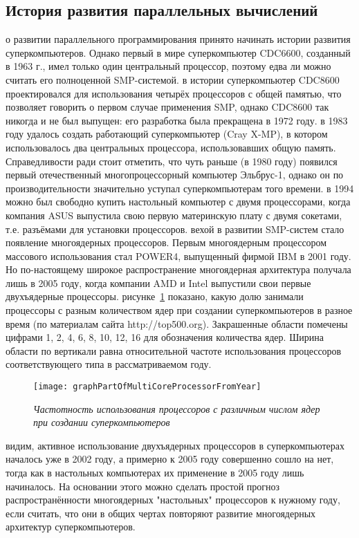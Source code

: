 { %
	\subsection{История развития параллельных вычислений}
	\Large{} о развитии параллельного программирования принято начинать истории развития суперкомпьютеров. Однако первый в мире суперкомпьютер CDC6600, созданный в 1963 г., имел только один центральный процессор, поэтому едва ли можно считать его полноценной SMP-системой. 
	 в истории суперкомпьютер CDC8600 проектировался для использования четырёх процессоров с общей памятью, что позволяет говорить о первом случае применения SMP, однако CDC8600 так никогда и не был выпущен: его разработка была прекращена в 1972 году. 
	 в 1983 году удалось создать работающий суперкомпьютер (Cray X-MP), в котором использовалось два центральных процессора, использовавших общую память. Справедливости ради стоит отметить, что чуть раньше (в 1980 году) появился первый отечественный многопроцессорный компьютер Эльбрус-1, однако он по производительности значительно уступал суперкомпьютерам того времени.
	 в 1994 можно был свободно купить настольный компьютер с двумя процессорами, когда компания ASUS выпустила свою первую материнскую плату с двумя сокетами, т.е. разъёмами для установки процессоров.
	 вехой в развитии SMP-систем стало появление многоядерных процессоров. Первым многоядерным процессором массового использования стал POWER4, выпущенный фирмой IBM в 2001 году. Но по-настоящему широкое распространение многоядерная архитектура получала лишь в 2005 году, когда компании AMD и Intel выпустили свои первые двухъядерные процессоры.  
	 рисунке~\ref{graphPartOfMultiCoreProcessorFromYear:image} показано, какую долю занимали процессоры с разным количеством ядер при создании суперкомпьютеров в разное время (по материалам сайта http://top500.org). Закрашенные области помечены цифрами 1, 2, 4, 6, 8, 10, 12, 16 для обозначения количества ядер. Ширина области по вертикали равна относительной частоте использования процессоров соответствующего типа в рассматриваемом году.
	\begin{figure}[H]
		\texttt{[image: graphPartOfMultiCoreProcessorFromYear]}
		\caption{\textit{Частотность использования процессоров с различным числом ядер при создании суперкомпьютеров}}
		\label{graphPartOfMultiCoreProcessorFromYear:image}
	\end{figure}
	 видим, активное использование двухъядерных процессоров в суперкомпьютерах началось уже в 2002 году, а примерно к 2005 году совершенно сошло на нет, тогда как в настольных компьютерах их применение в 2005 году лишь начиналось. На основании этого можно сделать простой прогноз распространённости многоядерных "настольных" процессоров к нужному году, если считать, что они в общих чертах повторяют развитие многоядерных архитектур суперкомпьютеров.
	\par
}